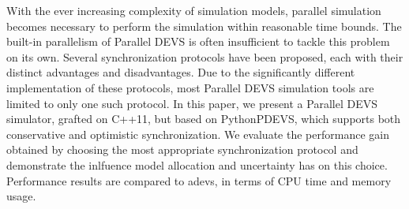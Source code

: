 With the ever increasing complexity of simulation models, parallel simulation
becomes necessary to perform the simulation within reasonable time bounds.
The built-in parallelism of Parallel DEVS is often insufficient to tackle this problem on its own.
Several synchronization protocols have been proposed, each with their distinct advantages and disadvantages.
Due to the significantly different implementation of these protocols, most Parallel DEVS simulation tools are limited to only one such protocol.
In this paper, we present a Parallel DEVS simulator, grafted on C++11, but based on PythonPDEVS, which supports both conservative and optimistic synchronization.
We evaluate the performance gain obtained by choosing the most appropriate synchronization protocol and demonstrate the inlfuence model allocation and uncertainty has on this choice. 
Performance results are compared to adevs, in terms of CPU time and memory usage.
